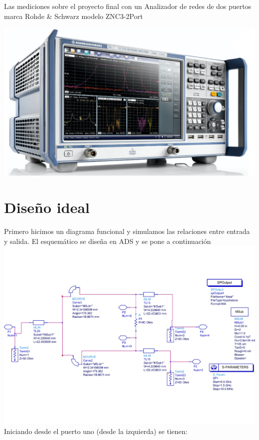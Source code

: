 \documentclass[a4paper, 12pt]{article}
\begin{document}
\begin{minipage}{0.4\linewidth}
  Las mediciones sobre el proyecto final con un Analizador de redes de dos puertos marca Rohde \& Schwarz modelo ZNC3-2Port \cite{RS_ZNC}
\end{minipage}
\begin{minipage}{0.59\linewidth}
  \includegraphics[width=\linewidth]{./img/vna.png}
\end{minipage}

\section*{Diseño ideal}
Primero hicimos un diagrama funcional y simulamos las relaciones entre entrada y salida.
El esquemático se diseña en ADS y se pone a continuación
\includegraphics[width = 0.9\linewidth]{./img/ideal.jpg}
Iniciando desde el puerto uno (desde la izquierda) se tienen:
\end{document}
